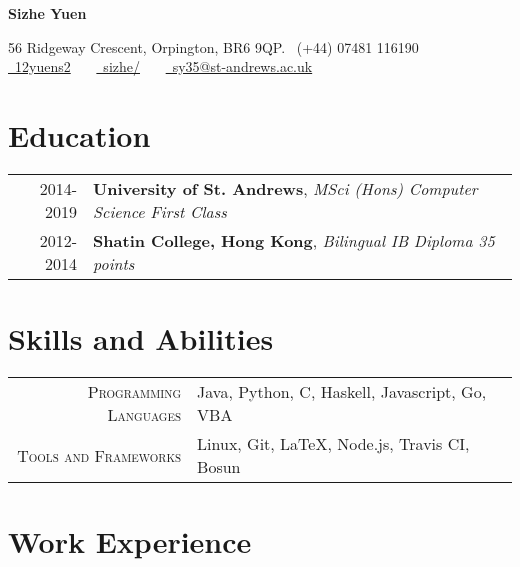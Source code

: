 \documentclass{article}
\begin{document}
\pagestyle{empty} %


\par{\centering
		{\Large \textbf{Sizhe Yuen}
	}\par}

\begin{center}
56 Ridgeway Crescent, Orpington, BR6 9QP. \faMobile\ (+44) 07481 116190\\
\href{https://github.com/12yuens2}{\faGithub\ 12yuens2} \ \ \ \href{https://www.linkedin.com/in/sizhe/}{\faLinkedin\ sizhe/} \ \ \ \href{mailto:sy35@st-andrews.ac.uk}{\faEnvelopeO\ sy35@st-andrews.ac.uk}
\end{center}


\section*{Education}
\begin{tabular}{r|p{15cm}}
\textsc{2014-2019} & \textbf{University of St. Andrews}, \textit{MSci (Hons) Computer Science First Class}
\\
\textsc{2012-2014} & \textbf{Shatin College, Hong Kong}, \textit{Bilingual IB Diploma 35 points}
\end{tabular}

\section*{Skills and Abilities}
\begin{tabular}{r|p{15cm}}
\textsc{Programming Languages} & Java, Python, C, Haskell, Javascript, Go, VBA\\

\textsc{Tools and Frameworks} & Linux, Git, \LaTeX, Node.js, Travis CI, Bosun
\end{tabular}

\section*{Work Experience}
\end{document}
